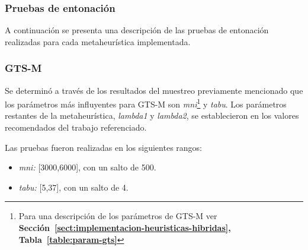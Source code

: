 \subsubsection{Pruebas de entonación} \label{subsect:pruebasentonacion}

A continuación se presenta una descripción de las pruebas de entonación realizadas para cada metaheurística implementada.


\subsubsection*{GTS-M}

Se determinó a través de los resultados del muestreo previamente mencionado que los parámetros más influyentes para GTS-M son \emph{mni}\footnote{Para una descripción de los parámetros de GTS-M ver \textbf{Sección~\ref{sect:implementacion-heuristicas-hibridas}, Tabla~\ref{table:param-gts}}} y \emph{tabu}. Los parámetros restantes de la metaheurística, \emph{lambda1} y \emph{lambda2}, se establecieron en los valores recomendados del  trabajo referenciado.

Las pruebas fueron realizadas en los siguientes rangos:

\begin{itemize}
\item \emph{mni:} [3000,6000], con un salto de 500.
\item \emph{tabu:} [5,37], con un salto de 4.
\end{itemize}

